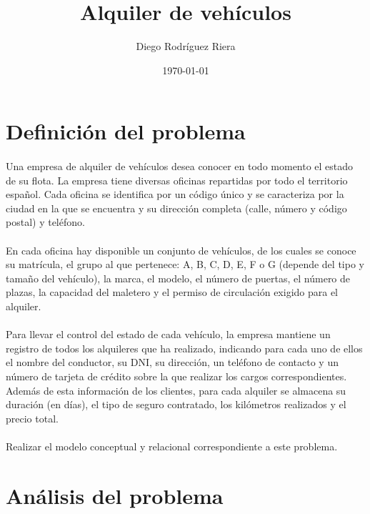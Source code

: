 \documentclass[a4paper,10pt]{article}
\title{Alquiler de vehículos}
\author{Diego Rodríguez Riera}
\date{\today}
\begin{document}
\maketitle
\pagebreak
\tableofcontents
\pagebreak

\section{Definición del problema}
\paragraph{}
Una empresa de alquiler de vehículos desea conocer en todo momento el estado de su flota. La empresa tiene diversas oficinas repartidas por todo el territorio español. Cada
oficina se identifica por un código único y se caracteriza por la ciudad en la que se encuentra y su dirección completa (calle, número y código postal) y teléfono.

\paragraph{}
En cada oficina hay disponible un conjunto de vehículos, de los cuales se conoce su matrícula, el grupo al que pertenece: A, B, C, D, E, F o G (depende del tipo y tamaño del vehículo), la marca, el modelo, el número de puertas, el número de plazas, la capacidad del maletero y el permiso de circulación exigido para el alquiler.
\paragraph{}
Para llevar el control del estado de cada vehículo, la empresa mantiene un registro de todos los alquileres que ha realizado, indicando para cada uno de ellos el nombre del
conductor, su DNI, su dirección, un teléfono de contacto y un número de tarjeta de crédito sobre la que realizar los cargos correspondientes. Además de esta información de los
clientes, para cada alquiler se almacena su duración (en días), el tipo de seguro contratado, los kilómetros realizados y el precio total.

\paragraph{}
Realizar el modelo conceptual y relacional correspondiente a este problema.

\pagebreak


\section{Análisis del problema}
\end{document}
